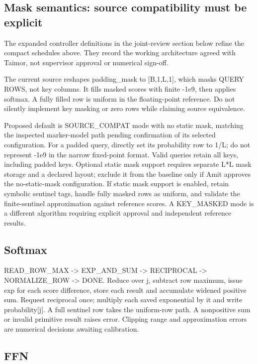 \documentclass[11pt,a4paper]{article}
\begin{document}
\subsection{Mask semantics: source compatibility must be explicit}

The expanded controller definitions in the joint-review section below refine the compact schedules above. They record the working architecture agreed with Taimor, not supervisor approval or numerical sign-off.

The current source reshapes padding\_mask to [B,1,L,1], which masks QUERY ROWS, not key columns. It fills masked scores with finite -1e9, then applies softmax. A fully filled row is uniform in the floating-point reference. Do not silently implement key masking or zero rows while claiming source equivalence.

Proposed default is SOURCE\_COMPAT mode with no static mask, matching the inspected marker-model path pending confirmation of its selected configuration. For a padded query, directly set its probability row to 1/L; do not represent -1e9 in the narrow fixed-point format. Valid queries retain all keys, including padded keys. Optional static mask support requires separate L*L mask storage and a declared layout; exclude it from the baseline only if Amit approves the no-static-mask configuration. If static mask support is enabled, retain symbolic sentinel tags, handle fully masked rows as uniform, and validate the finite-sentinel approximation against reference scores. A KEY\_MASKED mode is a different algorithm requiring explicit approval and independent reference results.

\subsection{Softmax}

READ\_ROW\_MAX -> EXP\_AND\_SUM -> RECIPROCAL -> NORMALIZE\_ROW -> DONE. Reduce over j, subtract row maximum, issue exp for each score difference, store each result and accumulate widened positive sum. Request reciprocal once; multiply each saved exponential by it and write probability[j]. A full sentinel row takes the uniform-row path. A nonpositive sum or invalid primitive result raises error. Clipping range and approximation errors are numerical decisions awaiting calibration.

\subsection{FFN}
\end{document}
